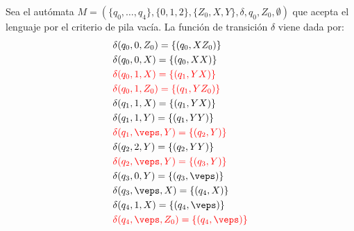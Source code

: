 \begin{ejercicio}
\begin{itemize}
        Sea el autómata $M = (\{q_0,\ldots,q_4\},\{0,1,2\},\{Z_0,X,Y\},\delta,q_0,Z_0,\emptyset)$ que acepta el lenguaje por el criterio de pila vacía. La función de transición $\delta$ viene dada por:
        \begin{align*}
            &\delta(q_0,0,Z_0) = \{(q_0,XZ_0)\} \\
            &\delta(q_0,0,X) = \{(q_0,XX)\} \\
            &\red{\delta(q_0,1,X) = \{(q_1,YX)\}} \\
            &\red{\delta(q_0,1,Z_0) = \{(q_1,YZ_0)\}} \\
            &\delta(q_1,1,X) = \{(q_1,YX)\} \\
            &\delta(q_1,1,Y) = \{(q_1,YY)\} \\
            &\red{\delta(q_1,\veps,Y) = \{(q_2,Y)\}} \\
            &\delta(q_2,2,Y) = \{(q_2,YY)\} \\
            &\red{\delta(q_2,\veps,Y) = \{(q_3,Y)\}} \\
            &\delta(q_3,0,Y) = \{(q_3,\veps)\} \\
            &\delta(q_3,\veps,X) = \{(q_4,X)\} \\
            &\delta(q_4,1,X) = \{(q_4,\veps)\} \\
            &\red{\delta(q_4,\veps,Z_0) = \{(q_4,\veps)\}}
        \end{align*}

    \end{itemize}
\end{ejercicio}


